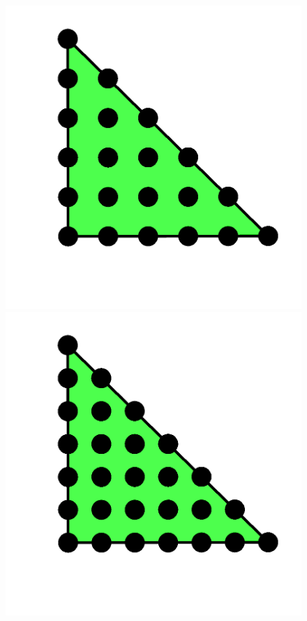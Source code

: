 \begin{figure}
{   \includegraphics[width=\threefigsfull]{chapters/kirby-6/png/CG5_2d.png}
   \includegraphics[width=\threefigsfull]{chapters/kirby-6/png/CG6_2d.png}}
\end{figure}

